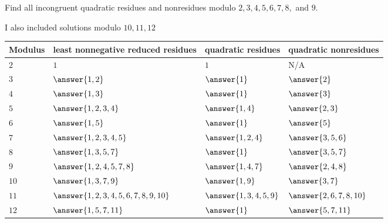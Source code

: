 \documentclass{ximera}
\begin{document}
\begin{br}
    Find all incongruent quadratic residues and nonresidues modulo $2,3,4,5,6,7,8,$ and $9$.

    \begin{solution}
        I also included solutions modulo $10,11,12$

        \begin{tabular}{p{1.5cm}|p{4cm}p{3cm}p{3cm}}
            Modulus & least nonnegative reduced residues & quadratic residues & quadratic nonresidues \\\hline
            $2$ & $1$   
                & $1$ 
                & N/A \\
            $3$ & $\answer{1,2}$ 
                & $\answer{1}$
                & $\answer{2}$\\
            $4$ & $\answer{1,3}$ 
                & $\answer{1}$
                & $\answer{3}$\\
            $5$ & $\answer{1,2,3,4}$
                & $\answer{1,4}$
                & $\answer{2,3}$\\
            $6$ & $\answer{1,5}$
                & $\answer{1}$
                & $\answer{5}$\\
            $7$ & $\answer{1,2,3,4,5}$
                & $\answer{1,2,4}$
                & $\answer{3,5,6}$\\
            $8$ & $\answer{1,3,5,7}$
                & $\answer{1}$
                & $\answer{3,5,7}$\\
            $9$ & $\answer{1,2,4,5,7,8}$
                & $\answer{1,4,7}$
                & $\answer{2,4,8}$\\
            $10$ & $\answer{1,3,7,9}$
                & $\answer{1,9}$
                & $\answer{3,7}$\\
            $11$ & $\answer{1,2,3,4,5,6,7,8,9,10}$
                & $\answer{1,3,4,5,9}$
                & $\answer{2,6,7,8,10}$\\
            $12$ & $\answer{1,5,7,11}$
                & $\answer{1}$
                & $\answer{5,7,11}$\\
        \end{tabular}
    \end{solution}
\end{br}
\end{document}

